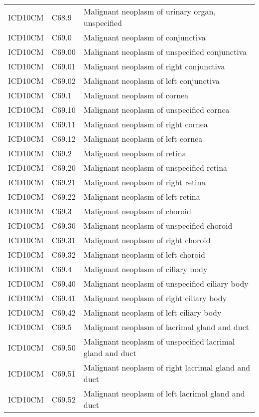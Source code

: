 \begin{table}[ht]
\begin{tabular}{lll}
  ICD10CM & C68.9 & Malignant neoplasm of urinary organ, unspecified \\ 
  ICD10CM & C69.0 & Malignant neoplasm of conjunctiva \\ 
  ICD10CM & C69.00 & Malignant neoplasm of unspecified conjunctiva \\ 
  ICD10CM & C69.01 & Malignant neoplasm of right conjunctiva \\ 
  ICD10CM & C69.02 & Malignant neoplasm of left conjunctiva \\ 
  ICD10CM & C69.1 & Malignant neoplasm of cornea \\ 
  ICD10CM & C69.10 & Malignant neoplasm of unspecified cornea \\ 
  ICD10CM & C69.11 & Malignant neoplasm of right cornea \\ 
  ICD10CM & C69.12 & Malignant neoplasm of left cornea \\ 
  ICD10CM & C69.2 & Malignant neoplasm of retina \\ 
  ICD10CM & C69.20 & Malignant neoplasm of unspecified retina \\ 
  ICD10CM & C69.21 & Malignant neoplasm of right retina \\ 
  ICD10CM & C69.22 & Malignant neoplasm of left retina \\ 
  ICD10CM & C69.3 & Malignant neoplasm of choroid \\ 
  ICD10CM & C69.30 & Malignant neoplasm of unspecified choroid \\ 
  ICD10CM & C69.31 & Malignant neoplasm of right choroid \\ 
  ICD10CM & C69.32 & Malignant neoplasm of left choroid \\ 
  ICD10CM & C69.4 & Malignant neoplasm of ciliary body \\ 
  ICD10CM & C69.40 & Malignant neoplasm of unspecified ciliary body \\ 
  ICD10CM & C69.41 & Malignant neoplasm of right ciliary body \\ 
  ICD10CM & C69.42 & Malignant neoplasm of left ciliary body \\ 
  ICD10CM & C69.5 & Malignant neoplasm of lacrimal gland and duct \\ 
  ICD10CM & C69.50 & Malignant neoplasm of unspecified lacrimal gland and duct \\ 
  ICD10CM & C69.51 & Malignant neoplasm of right lacrimal gland and duct \\ 
  ICD10CM & C69.52 & Malignant neoplasm of left lacrimal gland and duct \\ 

\end{tabular}
\end{table}
